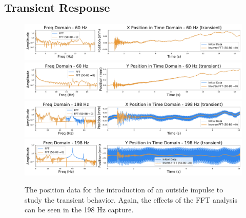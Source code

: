 \documentclass[12pt]{article}
\begin{document}
\subsection{Transient Response}
\begin{figure}[!ht]
\centering
    \includegraphics[width=\textwidth]{data_02_x_pos.pdf}
    \includegraphics[width=\textwidth]{data_02_y_pos.pdf}
    \includegraphics[width=\textwidth]{data_05_x_pos.pdf}
    \includegraphics[width=\textwidth]{data_05_y_pos.pdf}
	\caption{The position data for the introduction of an outside impulse to study the transient behavior. Again, the effects of the FFT analysis can be seen in the 198 Hz capture.}
    \label{fig:trans_pos}
\end{figure}
\end{document}
